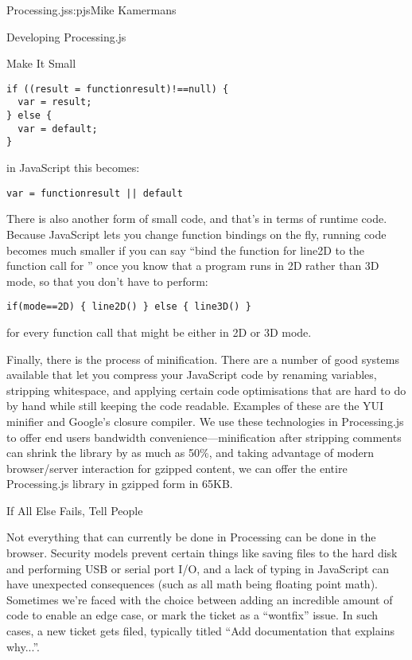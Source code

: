 \begin{aosachapter}{Processing.js}{s:pjs}{Mike Kamermans}
\begin{aosasect1}{Developing Processing.js}
\begin{aosasect2}{Make It Small}
\begin{verbatim}
if ((result = functionresult)!==null) {
  var = result;
} else {
  var = default;
}
\end{verbatim}

\noindent in JavaScript this becomes:

\begin{verbatim}
var = functionresult || default
\end{verbatim}

There is also another form of small code, and that's in terms of
runtime code. Because JavaScript lets you change function bindings on
the fly, running code becomes much smaller if you can say ``bind the
function for line2D to the function call for '' once you
know that a program runs in 2D rather than 3D mode, so that you don't
have to perform:

\begin{verbatim}
if(mode==2D) { line2D() } else { line3D() }
\end{verbatim}

\noindent
for every function call that might be either in 2D or 3D mode.

Finally, there is the process of minification. There are a number of
good systems available that let you compress your JavaScript code by
renaming variables, stripping whitespace, and applying certain code
optimisations that are hard to do by hand while still keeping the code
readable. Examples of these are the YUI minifier and Google's closure
compiler. We use these technologies in Processing.js to offer end
users bandwidth convenience---minification after stripping comments
can shrink the library by as much as 50\%, and taking advantage of
modern browser/server interaction for gzipped content, we can offer
the entire Processing.js library in gzipped form in 65KB.

\end{aosasect2}

\begin{aosasect2}{If All Else Fails, Tell People}

Not everything that can currently be done in Processing can be done in
the browser. Security models prevent certain things like saving files
to the hard disk and performing USB or serial port I/O, and a lack of
typing in JavaScript can have unexpected consequences (such as all
math being floating point math). Sometimes we're faced with the choice
between adding an incredible amount of code to enable an edge case, or
mark the ticket as a ``wontfix'' issue. In such cases, a new ticket gets
filed, typically titled ``Add documentation that explains why...''.


\end{aosasect2}
\end{aosasect1}
\end{aosachapter}
